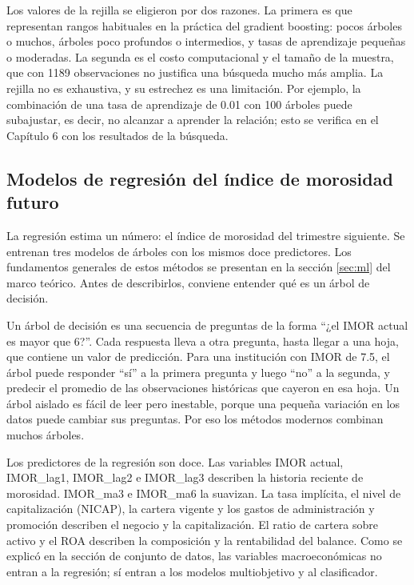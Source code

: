 Los valores de la rejilla se eligieron por dos razones. La primera es que representan rangos habituales en la práctica del gradient boosting: pocos árboles o muchos, árboles poco profundos o intermedios, y tasas de aprendizaje pequeñas o moderadas. La segunda es el costo computacional y el tamaño de la muestra, que con 1189 observaciones no justifica una búsqueda mucho más amplia. La rejilla no es exhaustiva, y su estrechez es una limitación. Por ejemplo, la combinación de una tasa de aprendizaje de 0.01 con 100 árboles puede subajustar, es decir, no alcanzar a aprender la relación; esto se verifica en el Capítulo 6 con los resultados de la búsqueda. %

\subsection{Modelos de regresión del índice de morosidad futuro}
La regresión estima un número: el índice de morosidad del trimestre siguiente. Se entrenan tres modelos de árboles con los mismos doce predictores. Los fundamentos generales de estos métodos se presentan en la sección \ref{sec:ml} del marco teórico. Antes de describirlos, conviene entender qué es un árbol de decisión.

Un árbol de decisión es una secuencia de preguntas de la forma ``¿el IMOR actual es mayor que 6?''. Cada respuesta lleva a otra pregunta, hasta llegar a una hoja, que contiene un valor de predicción. Para una institución con IMOR de 7.5, el árbol puede responder ``sí'' a la primera pregunta y luego ``no'' a la segunda, y predecir el promedio de las observaciones históricas que cayeron en esa hoja. Un árbol aislado es fácil de leer pero inestable, porque una pequeña variación en los datos puede cambiar sus preguntas. Por eso los métodos modernos combinan muchos árboles.

Los predictores de la regresión son doce. Las variables IMOR actual, IMOR\_lag1, IMOR\_lag2 e IMOR\_lag3 describen la historia reciente de morosidad. IMOR\_ma3 e IMOR\_ma6 la suavizan. La tasa implícita, el nivel de capitalización (NICAP), la cartera vigente y los gastos de administración y promoción describen el negocio y la capitalización. El ratio de cartera sobre activo y el ROA describen la composición y la rentabilidad del balance. Como se explicó en la sección de conjunto de datos, las variables macroeconómicas no entran a la regresión; sí entran a los modelos multiobjetivo y al clasificador.

